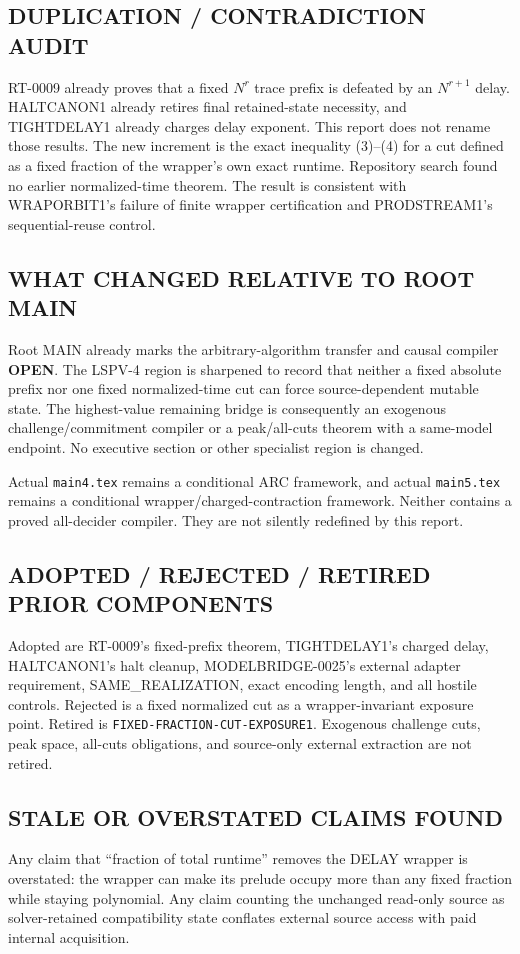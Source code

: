 \documentclass[11pt]{article}
\newcommand{\OPEN}{\textbf{OPEN}}
\begin{document}
\subsection*{DUPLICATION / CONTRADICTION AUDIT}
RT-0009 already proves that a fixed $N^r$ trace prefix is defeated by an
$N^{r+1}$ delay.  HALTCANON1 already retires final retained-state necessity,
and TIGHTDELAY1 already charges delay exponent.  This report does not rename
those results.  The new increment is the exact inequality (3)--(4) for a cut
defined as a fixed fraction of the wrapper's own exact runtime.  Repository
search found no earlier normalized-time theorem.  The result is consistent
with WRAPORBIT1's failure of finite wrapper certification and PRODSTREAM1's
sequential-reuse control.

\subsection*{WHAT CHANGED RELATIVE TO ROOT MAIN}
Root MAIN already marks the arbitrary-algorithm transfer and causal compiler
\OPEN.  The LSPV-4 region is sharpened to record that neither a fixed absolute
prefix nor one fixed normalized-time cut can force source-dependent mutable
state.  The highest-value remaining bridge is consequently an exogenous
challenge/commitment compiler or a peak/all-cuts theorem with a same-model
endpoint.  No executive section or other specialist region is changed.

Actual \texttt{main4.tex} remains a conditional ARC framework, and actual
\texttt{main5.tex} remains a conditional wrapper/charged-contraction
framework.  Neither contains a proved all-decider compiler.  They are not
silently redefined by this report.

\subsection*{ADOPTED / REJECTED / RETIRED PRIOR COMPONENTS}
Adopted are RT-0009's fixed-prefix theorem, TIGHTDELAY1's charged delay,
HALTCANON1's halt cleanup, MODELBRIDGE-0025's external adapter requirement,
SAME\_REALIZATION, exact encoding length, and all hostile controls.  Rejected
is a fixed normalized cut as a wrapper-invariant exposure point.  Retired is
\texttt{FIXED-FRACTION-CUT-EXPOSURE1}.  Exogenous challenge cuts, peak space,
all-cuts obligations, and source-only external extraction are not retired.

\subsection*{STALE OR OVERSTATED CLAIMS FOUND}
Any claim that ``fraction of total runtime'' removes the DELAY wrapper is
overstated: the wrapper can make its prelude occupy more than any fixed
fraction while staying polynomial.  Any claim counting the unchanged
read-only source as solver-retained compatibility state conflates external
source access with paid internal acquisition.
\end{document}
